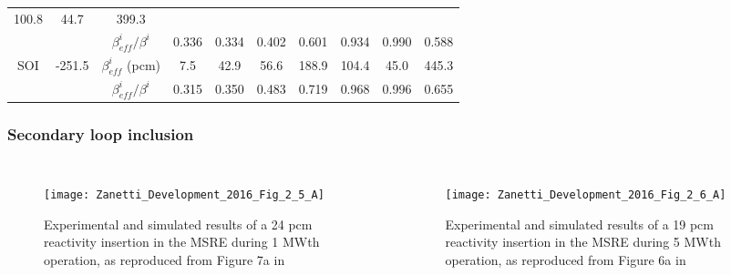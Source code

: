 \documentclass{beamer}
\begin{document}
\begin{frame}
\begin{table}[h]
\begin{center}
{\begin{tabular}{|c|c|c|c|c|c|c|c|c|c|}
                100.8 & 44.7 & 399.3 \\
            & & $\beta_{eff}^{i}/\beta^{i}$ & 0.336 & 0.334 & 0.402 & 0.601 &
                0.934 & 0.990 & 0.588 \\
            \hline
            SOI & -251.5 & $\beta_{eff}^{i}$ (pcm) & 7.5 & 42.9 & 56.6 & 188.9 &
                104.4 & 45.0 & 445.3 \\
            & & $\beta_{eff}^{i}/\beta^{i}$ & 0.315 & 0.350 & 0.483 & 0.719 &
                0.968 & 0.996 & 0.655 \\
            \hline
        \end{tabular}}
    \end{center}
\end{table}

\end{frame}

\begin{frame}
\frametitle{Secondary loop inclusion}

    \begin{columns}


\begin{figure}[H]
   \centering
   \texttt{[image: Zanetti\_Development\_2016\_Fig\_2\_5\_A]}
   \caption{Experimental and
   simulated results of a 24 pcm reactivity insertion in the MSRE during
    1 MWth operation, as reproduced from Figure 7a in 
    \cite{zanetti_extension_2015}}
   \label{fig:zanetti_sec_1mw}
\end{figure}


\begin{figure}[H]
   \centering
   \texttt{[image: Zanetti\_Development\_2016\_Fig\_2\_6\_A]}
   \caption{Experimental and
   simulated results of a 19 pcm reactivity insertion in the MSRE during 5 MWth
    operation, as reproduced from Figure 6a in \cite{zanetti_extension_2015}}
   \label{fig:zanetti_sec_5mw}
\end{figure}

\end{columns}

\end{frame}
\end{document}
